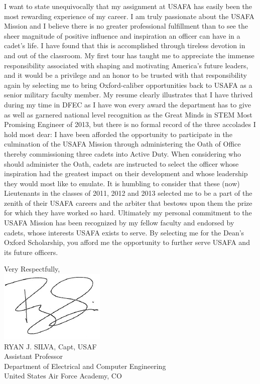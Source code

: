 \documentclass{article}
\begin{document}
I want to state unequivocally that my assignment at USAFA has easily been the
most rewarding experience of my career. I am truly passionate about the USAFA
Mission and I believe there is no greater professional fulfillment than to see
the sheer magnitude of positive influence and inspiration an officer can have
in a cadet's life. I have found that this is accomplished through tireless
devotion in and out of the classroom. My first tour has taught me to appreciate
the immense responsibility associated with shaping and motivating America's
future leaders, and it would be a privilege and an honor to be trusted with
that responsibility again by selecting me to bring Oxford-caliber opportunities
back to USAFA as a senior military faculty member. My resume clearly illustrates that I have thrived during my time in DFEC as I
have won every award the department has to give as well as garnered national
level recognition as the Great Minds in STEM Most Promising Engineer of 2013,
but there is no formal record of the three accolades I hold most dear: I have been
afforded the opportunity to participate in the culmination of the USAFA Mission
through administering the Oath of Office thereby commissioning three cadets into
Active Duty. When considering who should administer the Oath, cadets are
instructed to select the officer whose inspiration had the greatest impact on
their development and whose leadership they would most like to emulate. It is
humbling to consider that these (now) Lieutenants in the classes of 2011, 2012
and 2013 selected me to be a part of the zenith of their USAFA careers and the
arbiter that bestows upon them the prize for which they have worked so hard.
Ultimately my personal commitment to the USAFA Mission has been recognized by
my fellow faculty and endorsed by cadets, whose interests USAFA exists to
serve. By selecting me for the Dean's Oxford Scholarship, you afford me the opportunity
to further serve USAFA and its future officers.

\vspace{10mm}
\hspace*{2.3in} \noindent Very Respectfully, \\
\hspace*{2.5in} \includegraphics[scale=.5]{silvasig}  \\
\hspace*{2.5in} RYAN J. SILVA, Capt, USAF \\
\hspace*{2.5in} Assistant Professor   \\
\hspace*{2.5in} Department of Electrical and Computer Engineering  \\
\hspace*{2.5in} United States Air Force Academy, CO  \\
\renewcommand\contentsname{Attachments}\tableofcontents
\end{document}
